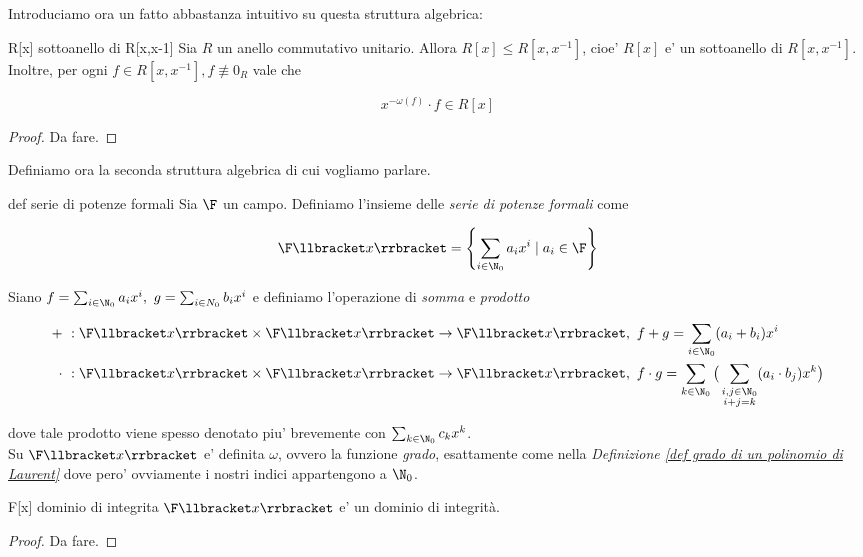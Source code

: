 \noindent Introduciamo ora un fatto abbastanza intuitivo su questa struttura algebrica:

\begin{lem}[]{R[x] sottoanello di R[x,x-1]}
  Sia $R$ un anello commutativo unitario. Allora $R[x] \leq R[x, x^{-1}]$, cioe' $R[x]$ e' un sottoanello di $R[x,x^{-1}]$.
  Inoltre, per ogni $f\in R[x,x^{-1}], f \not\equiv 0_R$ vale che

  \[ x^{-\omega(f)} \cdot f \in R[x] \]
\end{lem}
\begin{proof}
  Da fare.
\end{proof}

\noindent Definiamo ora la seconda struttura algebrica di cui vogliamo parlare.

\begin{defn}{def serie di potenze formali}
  Sia $\F$ un campo. Definiamo l'insieme delle \emph{serie di potenze formali} come 

  \[ \F\llbracket x \rrbracket = \left\{ \sum\limits_{i \in \N_0} a_i x^i \mid a_i \in \F \right\} \]

  \noindent Siano $f = \sum_{i\in \N_0}a_i x^i,\ g = \sum_{i\in N_0}b_i x^i$ e definiamo l'operazione di \emph{somma} e \emph{prodotto}

  \begin{align*}
    +\ &: \F\llbracket x \rrbracket \times \F\llbracket x \rrbracket \rightarrow \F\llbracket x \rrbracket,\ f + g = \sum\limits_{i\in \N_0}(a_i + b_i)x^i \\ 
    \cdot\ &: \F\llbracket x \rrbracket \times \F\llbracket x \rrbracket \rightarrow \F\llbracket x \rrbracket,\ f \cdot g = \sum\limits_{k\in \N_0} \big(\sum_{\substack{i,j\in \N_0\\i+j = k}} (a_i \cdot b_j)x^k \big)
  \end{align*}

  \noindent dove tale prodotto viene spesso denotato piu' brevemente con $\sum_{k\in \N_0} c_k x^k$. \vspace{0.5mm}\\
  \noindent Su $\F\llbracket x \rrbracket$ e' definita $\omega$, ovvero la funzione \emph{grado}, esattamente come nella \emph{Definizione 
  \ref{def grado di un polinomio di Laurent}} dove pero' ovviamente i nostri indici appartengono a $\N_0$.
\end{defn}

\begin{lem}[]{F[x] dominio di integrita}
  $\F\llbracket x \rrbracket$ e' un dominio di integrità.
\end{lem}
\begin{proof}
  Da fare.
\end{proof}

